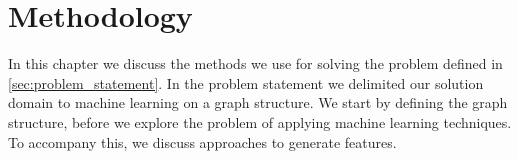 \chapter{Methodology}\label{chap:analysis}

In this chapter we discuss the methods we use for solving the problem defined in \cref{sec:problem_statement}. In the problem statement we delimited our solution domain to machine learning on a graph structure. We start by defining the graph structure, before we explore the problem of applying machine learning techniques. To accompany this, we discuss approaches to generate features.








